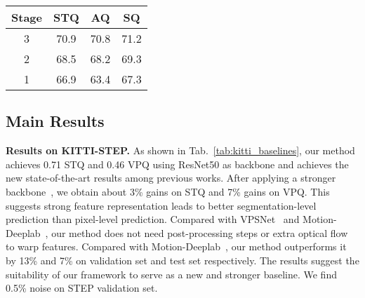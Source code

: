 \begin{table*}[h!]
{\begin{tabularx}{0.25\textwidth}{c c c c}
		        				\toprule[0.15em]
    		 Stage & STQ & AQ & SQ  \\
    		\toprule[0.15em]
    	    3 & 70.9 & 70.8 & 71.2 \\
    	    2 & 68.5 & 68.2 & 69.3 \\
    	    1 & 66.9 & 63.4 & 67.3 \\
        	\bottomrule[0.1em]
	    \end{tabularx}
    } \hfill
     \hfill
     \hfill
\end{table*}

\subsection{Main Results}

\noindent
\textbf{Results on KITTI-STEP.} As shown in Tab.~\ref{tab:kitti_baselines}, our method achieves 0.71 STQ and 0.46 VPQ using ResNet50 as backbone and achieves the new state-of-the-art results among previous works. After applying a stronger backbone~\cite{liu2021swin}, we obtain about 3\% gains on STQ and 7\% gains on VPQ. This suggests strong feature representation leads to better segmentation-level prediction than pixel-level prediction. Compared with VPSNet~\cite{kim2020vps} and Motion-Deeplab~\cite{STEP}, our method does not need post-processing steps or extra optical flow to warp features. Compared with Motion-Deeplab~\cite{STEP}, our method outperforms it by 13\% and 7\% on validation set and test set respectively. The results suggest the suitability of our framework to serve as a new and stronger baseline. We find 0.5\% noise on STEP validation set.

